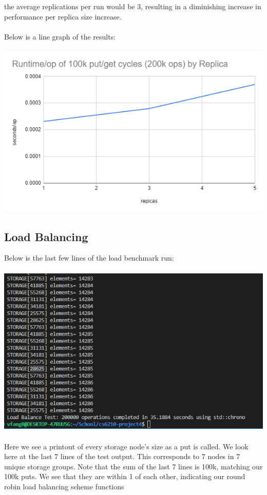 \documentclass{article}
\begin{document}
the average replications per run would be 3, resulting in a diminishing increase in performance per replica size increase.\\\\
Below is a line graph of the results:\\\\
\includegraphics[width=\linewidth]{img/PerformanceChart.png} 

\pagebreak
\subsection{Load Balancing}
Below is the last few lines of the load benchmark run:\\\\
\includegraphics[width=\linewidth]{img/load71.png}\\\\

Here we see a printout of every storage node's size as a put is called. We look here at the last 7 lines of the test output. This corresponds to 7 nodes in 7 unique
storage groups. Note that the sum of the last 7 lines is 100k, matching our 100k puts. We see that they are within 1 of each other, 
indicating our round robin load balancing scheme functions
\end{document}
